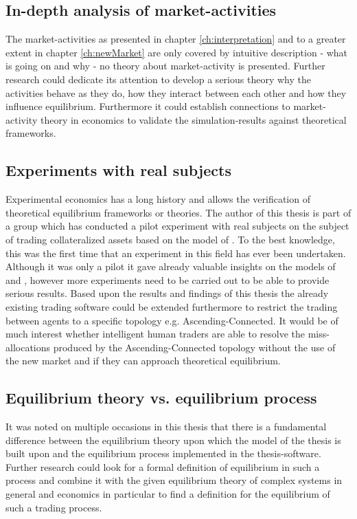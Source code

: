 \documentclass[Bachelorarbeit.tex]{subfiles}
\begin{document}
\subsection*{In-depth analysis of market-activities}
The market-activities as presented in chapter \ref{ch:interpretation} and to a greater extent in chapter \ref{ch:newMarket} are only covered by intuitive description - what is going on and why - no theory about market-activity is presented. Further research could dedicate its attention to develop a serious theory why the activities behave as they do, how they interact between each other and how they influence equilibrium. Furthermore it could establish connections to market-activity theory in economics to validate the simulation-results against theoretical frameworks.

\subsection*{Experiments with real subjects}
Experimental economics has a long history and allows the verification of theoretical equilibrium frameworks or theories. The author of this thesis is part of a group which has conducted a pilot experiment with real subjects on the subject of trading collateralized assets based on the model of \cite{Breuer2015}. To the best knowledge, this was the first time that an experiment in this field has ever been undertaken. Although it was only a pilot it gave already valuable insights on the models of \cite{Breuer2015} and \cite{Geanakoplos2009}, however more experiments need to be carried out to be able to provide serious results. Based upon the results and findings of this thesis the already existing trading software could be extended furthermore to restrict the trading between agents to a specific topology e.g. Ascending-Connected. It would be of much interest whether intelligent human traders are able to resolve the miss-allocations produced by the Ascending-Connected topology without the use of the new market and if they can approach theoretical equilibrium.

\subsection*{Equilibrium theory vs. equilibrium process}
It was noted on multiple occasions in this thesis that there is a fundamental difference between the equilibrium theory upon which the model of the thesis is built upon and the equilibrium process implemented in the thesis-software. Further research could look for a formal definition of equilibrium in such a process and combine it with the given equilibrium theory of complex systems in general and economics in particular to find a definition for the equilibrium of such a trading process.
\end{document}
